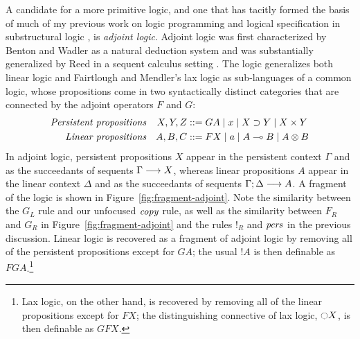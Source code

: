 A candidate for a more primitive logic, and one that has tacitly
formed the basis of much of my previous work on logic programming and
logical specification in substructural logic
\cite{simmons09weak,simmons11logical}, is {\it adjoint logic}.
Adjoint logic was first characterized by Benton and Wadler as a
natural deduction system \cite{benton96linear} and was substantially
generalized by Reed in a sequent calculus setting
\cite{reed09judgmental}. The logic generalizes both linear logic and
Fairtlough and Mendler's lax logic \cite{fairtlough95propositional}
as sub-languages of a common logic, whose propositions come
in two syntactically distinct categories that are connected by the
adjoint operators $F$ and $G$:
\begin{align*}
\mbox{\it Persistent propositions} & &
X, Y, Z & ::= G A \mid x \mid X \supset Y \mid X \times Y\\
\mbox{\it Linear propositions} & & 
A, B, C & ::= F X \mid a \mid A \multimap B \mid A \otimes B
\end{align*}
In adjoint logic, persistent propositions $X$ appear in the
persistent context $\Gamma$ and as the succeedants of sequents
${\Gamma} \longrightarrow {X} \mathstrut$, whereas linear propositions $A$ appear in
the linear context $\Delta$ and as the succeedants of sequents
${\Gamma};{\Delta} \longrightarrow {A} \mathstrut$. A fragment of the logic is shown in
Figure~\ref{fig:fragment-adjoint}.  Note the similarity between the
$G_L$ rule and our unfocused ${\it copy}$ rule, as well as the
similarity between $F_R$ and $G_R$ in
Figure~\ref{fig:fragment-adjoint} and the rules ${!}_R$ and ${\it
  pers}$ in the previous discussion.  Linear logic is recovered as a
fragment of adjoint logic by removing all of the persistent
propositions except for $GA$; the usual ${!}A$ is then definable as
$FGA$.\footnote{Lax logic, on the other hand, is recovered by removing
  all of the linear propositions except for $FX$; the distinguishing
  connective of lax logic, $\ocircle X$, is then definable as $GFX$.}

